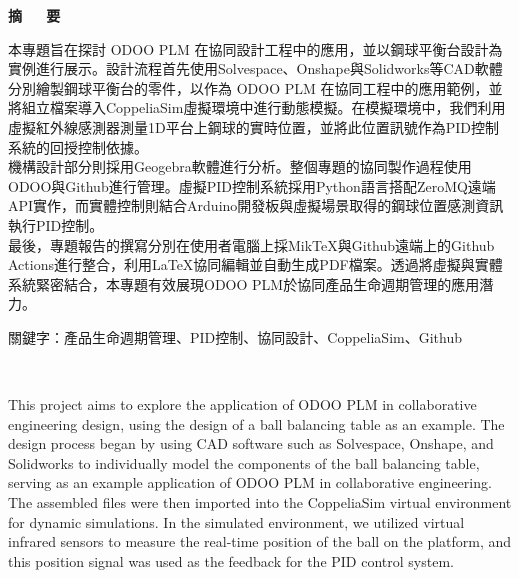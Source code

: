 \renewcommand{\baselinestretch}{1.5} %
\clearpage  %
\sectionef
{} %
\begin{center}
\LARGE\textbf{摘~~~要}\\
\end{center}

\justifying
\fontsize{14pt}{20pt}\sectionef\hspace{12pt}\quad 本專題旨在探討 ODOO PLM 在協同設計工程中的應用，並以鋼球平衡台設計為實例進行展示。設計流程首先使用Solvespace、Onshape與Solidworks等CAD軟體分別繪製鋼球平衡台的零件，以作為 ODOO PLM 在協同工程中的應用範例，並將組立檔案導入CoppeliaSim虛擬環境中進行動態模擬。在模擬環境中，我們利用虛擬紅外線感測器測量1D平台上鋼球的實時位置，並將此位置訊號作為PID控制系統的回授控制依據。\\

\fontsize{14pt}{20pt}\sectionef\hspace{12pt}\quad 機構設計部分則採用Geogebra軟體進行分析。整個專題的協同製作過程使用ODOO與Github進行管理。虛擬PID控制系統採用Python語言搭配ZeroMQ遠端API實作，而實體控制則結合Arduino開發板與虛擬場景取得的鋼球位置感測資訊執行PID控制。\\

\fontsize{14pt}{20pt}\sectionef\hspace{12pt}\quad 最後，專題報告的撰寫分別在使用者電腦上採MikTeX與Github遠端上的Github Actions進行整合，利用LaTeX協同編輯並自動生成PDF檔案。透過將虛擬與實體系統緊密結合，本專題有效展現ODOO PLM於協同產品生命週期管理的應用潛力。\\


\begin{hangparas}{1.5cm}{1}
\fontsize{14pt}{20pt}\sectionef
關鍵字：產品生命週期管理、PID控制、協同設計、CoppeliaSim、Github
\end{hangparas}
\newpage
\begin{center}
\renewcommand{\baselinestretch}{1.5} %
\LARGE\textbf{}\\
\end{center}

\justifying\fontsize{14pt}{16pt}\sectionef\hspace{12pt}\quad This project aims to explore the application of ODOO PLM in collaborative engineering design, using the design of a ball balancing table as an example. The design process began by using CAD software such as Solvespace, Onshape, and Solidworks to individually model the components of the ball balancing table, serving as an example application of ODOO PLM in collaborative engineering. The assembled files were then imported into the CoppeliaSim virtual environment for dynamic simulations. In the simulated environment, we utilized virtual infrared sensors to measure the real-time position of the ball on the platform, and this position signal was used as the feedback for the PID control system.\\

